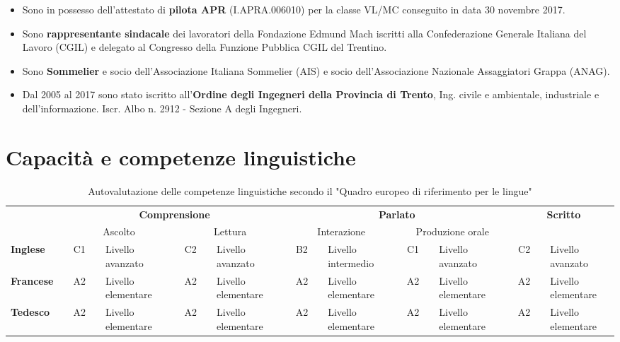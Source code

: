 \documentclass{curriculum}
\begin{document}
\begin{itemize}[label=\textendash]
            \item Sono in possesso dell'attestato di \textbf{pilota APR} (I.APRA.006010) per la classe VL/MC conseguito in data 30 novembre 2017.
            \item Sono \textbf{rappresentante sindacale} dei lavoratori della Fondazione Edmund Mach iscritti alla Confederazione Generale Italiana del Lavoro (CGIL) e delegato al Congresso della Funzione Pubblica CGIL del Trentino.
            \item Sono \textbf{Sommelier} e socio dell'Associazione Italiana Sommelier (AIS) e socio dell'Associazione Nazionale Assaggiatori Grappa (ANAG).
            \item Dal 2005 al 2017 sono stato iscritto all'\textbf{Ordine degli Ingegneri della Provincia di Trento}, Ing. civile e ambientale, industriale e dell'informazione. Iscr. Albo n. 2912 - Sezione A degli Ingegneri. 
        \end{itemize}

        \section{Capacità e competenze linguistiche}
        \begin{table}[h]
        \centering
        \fontsize{8}{9}\selectfont
            \begin{tabular}{l c c c l c c c l c c c l c c c l c c c l}
                \toprule
                & & \multicolumn{7}{c}{\textbf{Comprensione}} & & \multicolumn{7}{c}{\textbf{Parlato}} & & \multicolumn{3}{c}{\textbf{Scritto}}\\
                & & \multicolumn{3}{c}{Ascolto} & &\multicolumn{3}{c}{Lettura} & & \multicolumn{3}{c}{Interazione} & &\multicolumn{3}{c}{Produzione orale}  & & \multicolumn{3}{c}{}\\
                \cmidrule{3-9} \cmidrule{11-17} \cmidrule{19-21}
                \textbf{Inglese} & \phantom{ab} & C1 & \phantom{a} & Livello avanzato & \phantom{ab} & C2 & \phantom{a} & Livello avanzato & \phantom{ab} & B2 & \phantom{a} & Livello intermedio & \phantom{ab} & C1 & \phantom{a} & Livello avanzato & \phantom{ab} & C2 & \phantom{a} & Livello avanzato\\
                \textbf{Francese} & \phantom{ab} & A2 & \phantom{a} & Livello elementare & \phantom{ab} & A2 & \phantom{a} & Livello elementare & \phantom{ab} & A2 & \phantom{a} & Livello elementare & \phantom{ab} & A2 & \phantom{a} & Livello elementare & \phantom{ab} & A2 & \phantom{a} & Livello elementare\\
                \textbf{Tedesco}  & \phantom{ab} & A2 & \phantom{a} & Livello elementare & \phantom{ab} & A2 & \phantom{a} & Livello elementare & \phantom{ab} & A2 & \phantom{a} & Livello elementare & \phantom{ab} & A2 & \phantom{a} & Livello elementare & \phantom{ab} & A2 & \phantom{a} & Livello elementare\\
                \bottomrule
            \end{tabular}
            \caption*{\fontsize{9}{10}\selectfont Autovalutazione delle competenze linguistiche secondo il "Quadro europeo di riferimento per le lingue"}
        \end{table}
\end{document}
